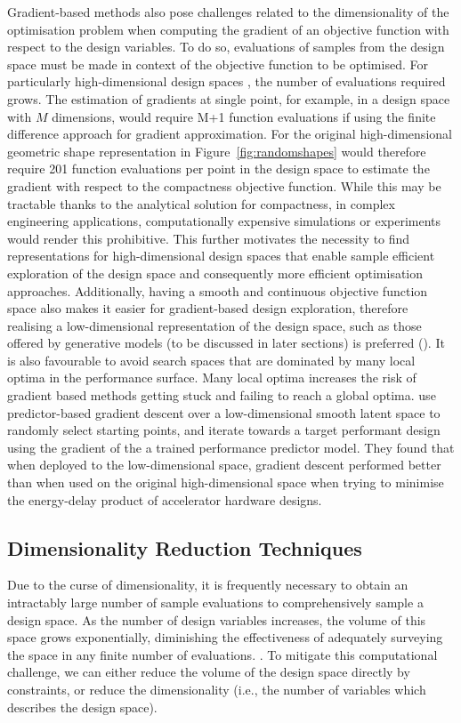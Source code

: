 \documentclass{article}
\begin{document}
Gradient-based methods also pose challenges related to the dimensionality of the optimisation problem when computing the gradient of an objective function with respect to the design variables. To do so, evaluations of samples from the design space must be made in context of the objective function to be optimised. For particularly high-dimensional design spaces \citep{Serani2024}, the number of evaluations required grows. The estimation of gradients at single point, for example, in a design space with $M$ dimensions, would require M+1 function evaluations if using the finite difference approach for gradient approximation. For the original high-dimensional geometric shape representation in Figure~\ref{fig:randomshapes} would therefore require 201 function evaluations per point in the design space to estimate the gradient with respect to the compactness objective function. While this may be tractable thanks to the analytical solution for compactness, in complex engineering applications, computationally expensive simulations or experiments would render this prohibitive. This further motivates the necessity to find representations for high-dimensional design spaces that enable  sample efficient exploration of the design space and consequently more efficient optimisation approaches. Additionally, having a smooth and continuous objective function space also makes it easier for gradient-based design exploration, therefore realising a low-dimensional representation of the design space, such as those offered by generative models (to be discussed in later sections) is preferred (\cite{bottou2010large}). It is also favourable to avoid search spaces that are dominated by many  local optima in the performance surface. Many local optima increases the risk of gradient based methods getting stuck and failing to reach a global optima. \cite{Huang2022} use predictor-based gradient descent over a low-dimensional smooth latent space to randomly select starting points, and iterate towards a target performant design using the gradient of the a trained performance predictor model. They found that when deployed to the low-dimensional space, gradient descent performed better than when used on the original high-dimensional space when trying to minimise the energy-delay product of accelerator hardware designs. 

\subsection{Dimensionality Reduction Techniques}
Due to the curse of dimensionality, it is frequently necessary to obtain an intractably large number of sample evaluations to comprehensively sample a design space. As the number of design variables increases, the volume of this space grows exponentially, diminishing the effectiveness of adequately surveying the space in any finite number of evaluations. \citep{Serani2024}. To mitigate this computational challenge, we can either reduce the volume of the design space directly by constraints, or reduce the dimensionality (i.e., the number of variables which describes the design space). 
\end{document}
